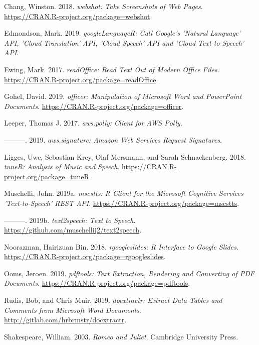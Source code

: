 \leavevmode\hypertarget{ref-webshot}{}%
Chang, Winston. 2018. \emph{webshot: Take Screenshots of Web Pages}.
\url{https://CRAN.R-project.org/package=webshot}.

\leavevmode\hypertarget{ref-googleLanguageR}{}%
Edmondson, Mark. 2019. \emph{googleLanguageR: Call Google's 'Natural
Language' API, 'Cloud Translation' API, 'Cloud Speech' API and 'Cloud
Text-to-Speech' API}.

\leavevmode\hypertarget{ref-readOffice}{}%
Ewing, Mark. 2017. \emph{readOffice: Read Text Out of Modern Office
Files}. \url{https://CRAN.R-project.org/package=readOffice}.

\leavevmode\hypertarget{ref-officer}{}%
Gohel, David. 2019. \emph{officer: Manipulation of Microsoft Word and
PowerPoint Documents}. \url{https://CRAN.R-project.org/package=officer}.

\leavevmode\hypertarget{ref-aws.polly}{}%
Leeper, Thomas J. 2017. \emph{aws.polly: Client for AWS Polly}.

\leavevmode\hypertarget{ref-aws.signature}{}%
---------. 2019. \emph{aws.signature: Amazon Web Services Request
Signatures}.

\leavevmode\hypertarget{ref-tuneR}{}%
Ligges, Uwe, Sebastian Krey, Olaf Mersmann, and Sarah Schnackenberg.
2018. \emph{tuneR: Analysis of Music and Speech}.
\url{https://CRAN.R-project.org/package=tuneR}.

\leavevmode\hypertarget{ref-mscstts}{}%
Muschelli, John. 2019a. \emph{mscstts: R Client for the Microsoft
Cognitive Services 'Text-to-Speech' REST API}.
\url{https://CRAN.R-project.org/package=mscstts}.

\leavevmode\hypertarget{ref-text2speech}{}%
---------. 2019b. \emph{text2speech: Text to Speech}.
\url{https://github.com/muschellij2/text2speech}.

\leavevmode\hypertarget{ref-rgoogleslides}{}%
Noorazman, Hairizuan Bin. 2018. \emph{rgoogleslides: R Interface to
Google Slides}. \url{https://CRAN.R-project.org/package=rgoogleslides}.

\leavevmode\hypertarget{ref-pdftools}{}%
Ooms, Jeroen. 2019. \emph{pdftools: Text Extraction, Rendering and
Converting of PDF Documents}.
\url{https://CRAN.R-project.org/package=pdftools}.

\leavevmode\hypertarget{ref-docxtractr}{}%
Rudis, Bob, and Chris Muir. 2019. \emph{docxtractr: Extract Data Tables
and Comments from Microsoft Word Documents}.
\url{http://gitlab.com/hrbrmstr/docxtractr}.

\leavevmode\hypertarget{ref-shakespeare2003romeo}{}%
Shakespeare, William. 2003. \emph{Romeo and Juliet}. Cambridge
University Press.

